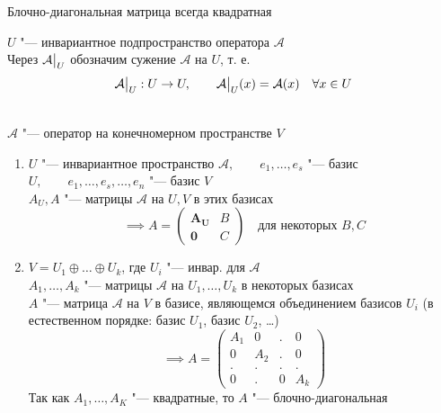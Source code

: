 \begin{remark}
	Блочно-диагональная матрица всегда квадратная
\end{remark}

\begin{definition}
	$ U $ "--- инвариантное подпространство оператора $ \mathcal{A} $ \\
	Через $ \mathcal{A}\big|_{U}^{} $ обозначим сужение $ \mathcal{A} $ на $ U $, т. е.
	$$ \mathcal{A}\big|_{U}^{} : U \to U, \qquad \mathcal{A}\big|_{U}^{}(x) = \mathcal{A}(x) \quad \forall x \in U $$
\end{definition}

\begin{theorem}
    \hfill \\
	$ \mathcal{A} $ "--- оператор на конечномерном пространстве $ V $
	\begin{enumerate}
		\item $ U $ "--- инвариантное пространство $ \mathcal{A}, \qquad e_1, \dots, e_s $ "--- базис $ U, \qquad e_1, \dots, e_s, \dots, e_n $ "--- базис $ V $ \\
		$ A_U, A $ "--- матрицы $ \mathcal{A} $ на $ U, V $ в этих базисах
		$$ \implies A =
		\begin{pmatrix}
			\bm{A_U} & B \\
			\bm0 & C
		\end{pmatrix} \quad \text{для некоторых } B, C $$

		\item $ V = U_1 \oplus \dots \oplus U_k $, где $ U_i $ "--- инвар. для $ \mathcal{A} $ \\
		$ A_1, \dots, A_k $ "--- матрицы $ \mathcal{A} $ на $ U_1, \dots, U_k $ в некоторых базисах \\
		$ A $ "--- матрица $ \mathcal{A} $ на $ V $ в базисе, являющемся объединением базисов $ U_i $ (в естественном порядке: базис $ U_1 $, базис $ U_2 $, \dots)
		$$ \implies A =
		\begin{pmatrix}
			A_1 & 0 & . & 0 \\
			0 & A_2 & . & 0 \\
			. & . & . & . \\
			0 & . & 0 & A_k
		\end{pmatrix} $$
		Так как $ A_1, \dots, A_K $ "--- квадратные, то $ A $ "--- блочно-диагональная
	\end{enumerate}
\end{theorem}

